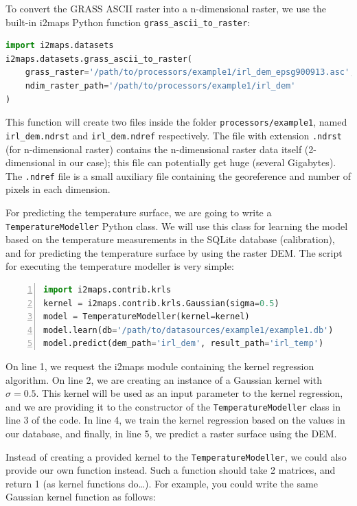 \documentclass[11pt]{article}
\begin{document}
To convert the GRASS ASCII raster into a n-dimensional raster, we use the built-in i2maps Python function \texttt{grass\_ascii\_to\_raster}:

\begin{lstlisting}[language=Python]
import i2maps.datasets
i2maps.datasets.grass_ascii_to_raster(
	grass_raster='/path/to/processors/example1/irl_dem_epsg900913.asc', 
	ndim_raster_path='/path/to/processors/example1/irl_dem'
)
\end{lstlisting}

This function will create two files inside the folder \texttt{processors/example1}, named \texttt{irl\_dem.ndrst} and \texttt{irl\_dem.ndref} respectively. The file with extension \texttt{.ndrst} (for n-dimensional raster) contains the n-dimensional raster data itself (2-dimensional in our case); this file can potentially get huge (several Gigabytes). The \texttt{.ndref} file is a small auxiliary file containing the georeference and number of pixels in each dimension.

For predicting the temperature surface, we are going to write a \texttt{TemperatureModeller} Python class. We will use this class for learning the model based on the temperature measurements in the SQLite database (calibration), and for predicting the temperature surface by using the raster DEM. The script for executing the temperature modeller is very simple:

\begin{lstlisting}[language=Python, numbers=left, numberstyle=\footnotesize, numbersep=5pt]
import i2maps.contrib.krls
kernel = i2maps.contrib.krls.Gaussian(sigma=0.5)
model = TemperatureModeller(kernel=kernel)
model.learn(db='/path/to/datasources/example1/example1.db')
model.predict(dem_path='irl_dem', result_path='irl_temp')
\end{lstlisting}

On line 1, we request the i2maps module containing the kernel regression algorithm. On line 2, we are creating an instance of a Gaussian kernel with $\sigma=0.5$. This kernel will be used as an input parameter to the kernel regression, and we are providing it to the constructor of the \texttt{TemperatureModeller} class in line 3 of the code. In line 4, we train the kernel regression based on the values in our database, and finally, in line 5, we predict a raster surface using the DEM.

Instead of creating a provided kernel to the \texttt{TemperatureModeller}, we could also provide our own function instead. Such a function should take 2 matrices, and return 1 (as kernel functions do\dots). For example, you could write the same Gaussian kernel function as follows:
\end{document}
